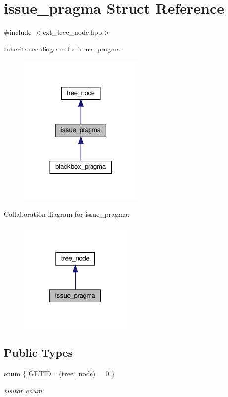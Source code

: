 \hypertarget{structissue__pragma}{}\section{issue\+\_\+pragma Struct Reference}
\label{structissue__pragma}


{\ttfamily \#include $<$ext\+\_\+tree\+\_\+node.\+hpp$>$}



Inheritance diagram for issue\+\_\+pragma\+:
\nopagebreak
\begin{figure}[H]
\begin{center}
\leavevmode
\includegraphics[width=173pt]{d5/d12/structissue__pragma__inherit__graph}
\end{center}
\end{figure}


Collaboration diagram for issue\+\_\+pragma\+:
\nopagebreak
\begin{figure}[H]
\begin{center}
\leavevmode
\includegraphics[width=157pt]{d2/d90/structissue__pragma__coll__graph}
\end{center}
\end{figure}
\subsection*{Public Types}
\begin{DoxyCompactItemize}
\item 
enum \{ \hyperlink{structissue__pragma_adf631266b05566f11057f85906bef09daa1f1070d7403af9523d2a967027bee74}{G\+E\+T\+ID} =(tree\+\_\+node) = 0
 \}\begin{DoxyCompactList}\small\item\em visitor enum \end{DoxyCompactList}
\end{DoxyCompactItemize}
